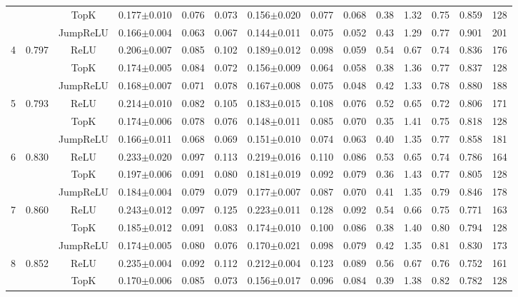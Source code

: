 \begin{table}[t]
\begin{adjustbox}{max width=\linewidth}
\begin{tabular}{llcccccccccccc}
 &  & TopK & 0.177$\pm$0.010 & 0.076 & 0.073 & 0.156$\pm$0.020 & 0.077 & 0.068 & 0.38 & 1.32 & 0.75 & 0.859 & 128 \\
 &  & JumpReLU & 0.166$\pm$0.004 & 0.063 & 0.067 & 0.144$\pm$0.011 & 0.075 & 0.052 & 0.43 & 1.29 & 0.77 & 0.901 & 201 \\
\midrule
4 & 0.797 & ReLU & 0.206$\pm$0.007 & 0.085 & 0.102 & 0.189$\pm$0.012 & 0.098 & 0.059 & 0.54 & 0.67 & 0.74 & 0.836 & 176 \\
 &  & TopK & 0.174$\pm$0.005 & 0.084 & 0.072 & 0.156$\pm$0.009 & 0.064 & 0.058 & 0.38 & 1.36 & 0.77 & 0.837 & 128 \\
 &  & JumpReLU & 0.168$\pm$0.007 & 0.071 & 0.078 & 0.167$\pm$0.008 & 0.075 & 0.048 & 0.42 & 1.33 & 0.78 & 0.880 & 188 \\
\midrule
5 & 0.793 & ReLU & 0.214$\pm$0.010 & 0.082 & 0.105 & 0.183$\pm$0.015 & 0.108 & 0.076 & 0.52 & 0.65 & 0.72 & 0.806 & 171 \\
 &  & TopK & 0.174$\pm$0.006 & 0.078 & 0.076 & 0.148$\pm$0.011 & 0.085 & 0.070 & 0.35 & 1.41 & 0.75 & 0.818 & 128 \\
 &  & JumpReLU & 0.166$\pm$0.011 & 0.068 & 0.069 & 0.151$\pm$0.010 & 0.074 & 0.063 & 0.40 & 1.35 & 0.77 & 0.858 & 181 \\
\midrule
6 & 0.830 & ReLU & 0.233$\pm$0.020 & 0.097 & 0.113 & 0.219$\pm$0.016 & 0.110 & 0.086 & 0.53 & 0.65 & 0.74 & 0.786 & 164 \\
 &  & TopK & 0.197$\pm$0.006 & 0.091 & 0.080 & 0.181$\pm$0.019 & 0.092 & 0.079 & 0.36 & 1.43 & 0.77 & 0.805 & 128 \\
 &  & JumpReLU & 0.184$\pm$0.004 & 0.079 & 0.079 & 0.177$\pm$0.007 & 0.087 & 0.070 & 0.41 & 1.35 & 0.79 & 0.846 & 178 \\
\midrule
7 & 0.860 & ReLU & 0.243$\pm$0.012 & 0.097 & 0.125 & 0.223$\pm$0.011 & 0.128 & 0.092 & 0.54 & 0.66 & 0.75 & 0.771 & 163 \\
 &  & TopK & 0.185$\pm$0.012 & 0.091 & 0.083 & 0.174$\pm$0.010 & 0.100 & 0.086 & 0.38 & 1.40 & 0.80 & 0.794 & 128 \\
 &  & JumpReLU & 0.174$\pm$0.005 & 0.080 & 0.076 & 0.170$\pm$0.021 & 0.098 & 0.079 & 0.42 & 1.35 & 0.81 & 0.830 & 173 \\
\midrule
8 & 0.852 & ReLU & 0.235$\pm$0.004 & 0.092 & 0.112 & 0.212$\pm$0.004 & 0.123 & 0.089 & 0.56 & 0.67 & 0.76 & 0.752 & 161 \\
 &  & TopK & 0.170$\pm$0.006 & 0.085 & 0.073 & 0.156$\pm$0.017 & 0.096 & 0.084 & 0.39 & 1.38 & 0.82 & 0.782 & 128 \\

\end{tabular}
\end{adjustbox}
\end{table}
